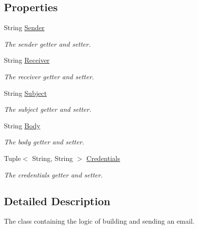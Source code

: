 \subsection*{Properties}
\begin{DoxyCompactItemize}
\item 
String \hyperlink{class_s_m_t_p_1_1_email_adf416a1fa24ab5d55e8ed451ac0727b5}{Sender}
\begin{DoxyCompactList}\small\item\em The sender getter and setter. \end{DoxyCompactList}\item 
String \hyperlink{class_s_m_t_p_1_1_email_aa0b48143973676c8cbc3bb4fd9c4efce}{Receiver}
\begin{DoxyCompactList}\small\item\em The receiver getter and setter. \end{DoxyCompactList}\item 
String \hyperlink{class_s_m_t_p_1_1_email_afedbc5aa7e9e35815b04d6c9d11ae6ee}{Subject}
\begin{DoxyCompactList}\small\item\em The subject getter and setter. \end{DoxyCompactList}\item 
String \hyperlink{class_s_m_t_p_1_1_email_a8086606e0815e9c3bcfe173b56853b41}{Body}
\begin{DoxyCompactList}\small\item\em The body getter and setter. \end{DoxyCompactList}\item 
Tuple$<$ String, String $>$ \hyperlink{class_s_m_t_p_1_1_email_a3d0bce9a0c0087a3c62e461476367cbb}{Credentials}
\begin{DoxyCompactList}\small\item\em The credentials getter and setter. \end{DoxyCompactList}\end{DoxyCompactItemize}


\subsection{Detailed Description}
The class containing the logic of building and sending an email. 



